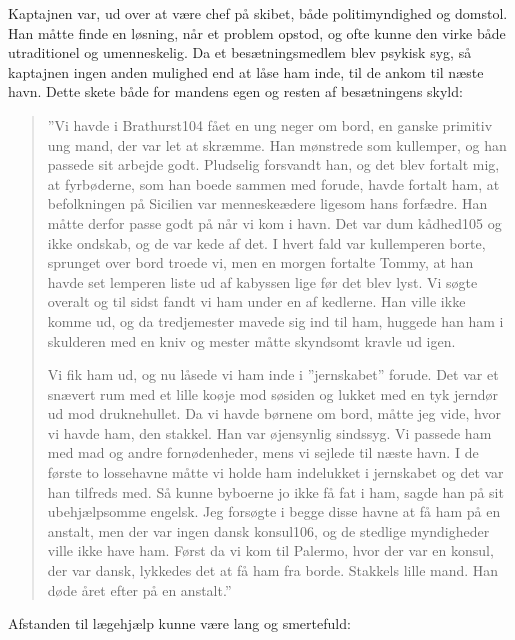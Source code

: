 Kaptajnen var, ud over at være chef på skibet, både politimyndighed og
domstol. Han måtte finde en løsning, når et problem opstod, og ofte kunne
den virke både utraditionel og umenneskelig. Da et besætningsmedlem blev
psykisk syg, så kaptajnen ingen anden mulighed end at låse ham inde, til
de ankom til næste havn. Dette skete både for mandens egen og resten af
besætningens skyld: 

\begin{quote}
    
    ''Vi havde i Brathurst104 fået en ung neger om bord, en ganske
    primitiv ung mand, der var let at skræmme. Han mønstrede som
    kullemper, og han passede sit arbejde godt. Pludselig forsvandt han,
    og det blev fortalt mig, at fyrbøderne, som han boede sammen med
    forude, havde fortalt ham, at befolkningen på Sicilien var
    menneskeædere ligesom hans forfædre. Han måtte derfor passe godt på
    når vi kom i havn. Det var dum kådhed105 og ikke ondskab, og de var
    kede af det. I hvert fald var kullemperen borte, sprunget over bord
    troede vi, men en morgen fortalte Tommy, at han havde set lemperen
    liste ud af kabyssen lige før det blev lyst. Vi søgte overalt og til
    sidst fandt vi ham under en af kedlerne.  Han ville ikke komme ud, og
    da tredjemester mavede sig ind til ham, huggede han ham i skulderen
    med en kniv og mester måtte skyndsomt kravle ud igen. 
    
    Vi fik ham ud, og nu låsede vi ham inde i ''jernskabet'' forude. Det
    var et snævert rum med et lille koøje mod søsiden og lukket med en
    tyk jerndør ud mod druknehullet. Da vi havde børnene om bord, måtte
    jeg vide, hvor vi havde ham, den stakkel. Han var øjensynlig
    sindssyg. Vi passede ham med mad og andre fornødenheder, mens vi
    sejlede til næste havn. I de første to lossehavne måtte vi holde ham
    indelukket i jernskabet og det var han tilfreds med. Så kunne
    byboerne jo ikke få fat i ham, sagde han på sit ubehjælpsomme
    engelsk. Jeg forsøgte i begge disse havne at få ham på en anstalt,
    men der var ingen dansk konsul106, og de stedlige myndigheder ville
    ikke have ham. Først da vi kom til Palermo, hvor der var en konsul,
    der var dansk, lykkedes det at få ham fra borde. Stakkels lille mand.
    Han døde året efter på en anstalt.''

\end{quote}

Afstanden til lægehjælp kunne være lang og smertefuld: 

